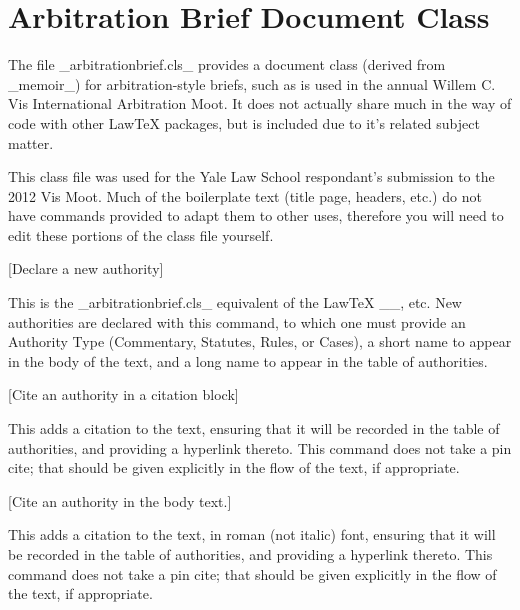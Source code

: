 \section{Arbitration Brief Document Class}
 The file _arbitrationbrief.cls_ provides a document class (derived from _memoir_) for arbitration-style briefs, such as is used
 in the annual Willem C. Vis International Arbitration Moot. It does not actually share much in the way
 of code with other LawTeX packages, but is included due to it's related subject matter.

 This class file was used for the Yale Law School respondant's submission to the 2012 Vis Moot. Much of the boilerplate text 
 (title page, headers, etc.) do not have commands provided to adapt them to other uses, therefore you will need to edit these 
 portions of the class file yourself.


[Declare a new authority]

 \noindent This is the _arbitrationbrief.cls_ equivalent of the LawTeX _\newcase_, etc. New authorities are declared with this command, to which one
 must provide an Authority Type (Commentary, Statutes, Rules, or Cases), a short name to appear in the body of the text, and a long name to 
 appear in the table of authorities.


[Cite an authority in a citation block]

 \noindent This adds a citation to the text, ensuring that it will be recorded in the table of authorities, and providing a hyperlink thereto.
 This command does not take a pin cite; that should be given explicitly in the flow of the text, if appropriate.


[Cite an authority in the body text.]

 \noindent This adds a citation to the text, in roman (not italic) font, ensuring that it will be recorded in the table of authorities, and providing a hyperlink thereto.
 This command does not take a pin cite; that should be given explicitly in the flow of the text, if appropriate. 

